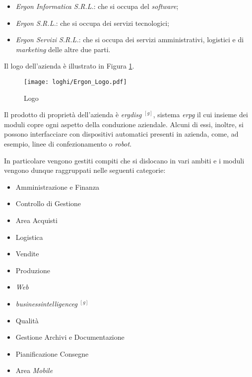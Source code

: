 \begin{itemize}
    \item \textit{Ergon Informatica S.R.L.}: che si occupa del \textit{software};
    \item \textit{Ergon S.R.L.}: che si occupa dei servizi tecnologici;
    \item \textit{Ergon Servizi S.R.L.}: che si occupa dei servizi amministrativi, logistici e di \textit{marketing} delle altre due parti.
\end{itemize}
Il logo dell'azienda è illustrato in Figura \ref{fig:logo}.
\vfill
\begin{figure}[!h]
    \centering
    \texttt{[image: loghi/Ergon\_Logo.pdf]}
    \caption{Logo \myCompany}
    \label{fig:logo}
\end{figure}
\vfill
\noindent Il prodotto di proprietà dell'azienda è \textit{\gls{ergdisg}} $^{[g]}$, sistema \textit{\gls{erpg}}
il cui insieme dei moduli copre ogni aspetto della conduzione aziendale.
Alcuni di essi, inoltre, si possono interfacciare con dispositivi automatici presenti in azienda, come, ad esempio,
linee di confezionamento o \textit{robot}.

\newpage
\noindent In particolare  vengono gestiti compiti che si dislocano in vari ambiti e
i moduli vengono dunque raggruppati nelle seguenti categorie:
\begin{multicols}{2}
\begin{itemize}
    \item Amministrazione e Finanza
    \item Controllo di Gestione
    \item Area Acquisti
    \item Logistica
    \item Vendite
    \item Produzione
\end{itemize}
\begin{itemize}
    \item \textit{Web}
    \item \textit{\gls{businessintelligenceg}} $^{[g]}$
    \item Qualità
    \item Gestione Archivi e Documentazione
    \item Pianificazione Consegne
    \item Area \textit{Mobile}
\end{itemize}
\end{multicols}

